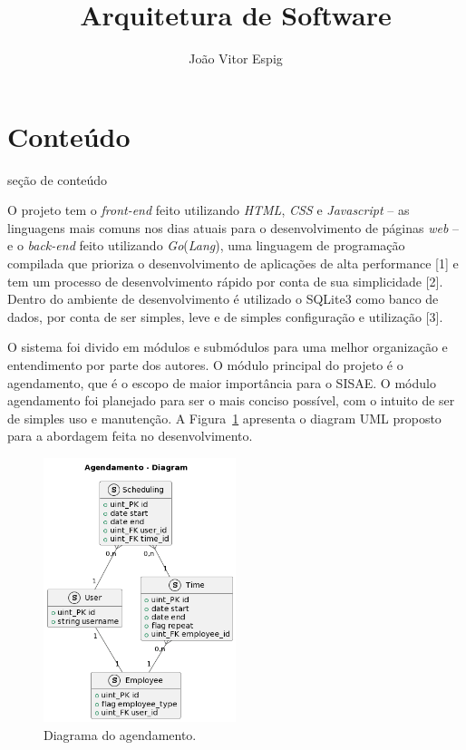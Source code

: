 \documentclass[a4paper, 12pt]{article}
\title{Arquitetura de Software}
\author{João Vitor Espig}
\begin{document}
    \maketitle
    \section{Conteúdo}
    seção de conteúdo

    O projeto tem o \textit{front-end} feito utilizando \textit{HTML}, \textit{CSS} e \textit{Javascript} -- as linguagens mais comuns nos dias atuais para o desenvolvimento de páginas \textit{web} -- e o \textit{back-end} feito utilizando \textit{Go}(\textit{Lang}), uma linguagem de programação compilada que prioriza o desenvolvimento de aplicações de alta performance [1] e tem um processo de desenvolvimento rápido por conta de sua simplicidade [2]. Dentro do ambiente de desenvolvimento é utilizado o SQLite3 como banco de dados, por conta de ser simples, leve e de simples configuração e utilização [3].

    O sistema foi divido em módulos e submódulos para uma melhor organização e entendimento por parte dos autores. O módulo principal do projeto é o agendamento, que é o escopo de maior importância para o SISAE. O módulo agendamento foi planejado para ser o mais conciso possível, com o intuito de ser de simples uso e manutenção. A Figura~\ref{fig:umldiagram} apresenta o diagram UML proposto para a abordagem feita no desenvolvimento.

    \begin{figure}[H]
        \begin{center}
            \includegraphics[width=0.5\textwidth]{uml-diagram-img}
        \end{center}
        \caption{Diagrama do agendamento.}
        \label{fig:umldiagram}
    \end{figure}
\end{document}

